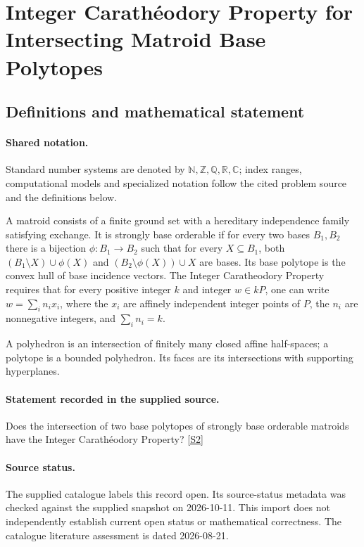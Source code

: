 \documentclass[11pt]{article}
\newcommand{\sref}[2]{\hyperlink{source:#1:#2}{[S#2]}}
\begin{document}
\section{Integer Carathéodory Property for Intersecting Matroid Base Polytopes}\label{statement}

\subsection{Definitions and mathematical statement}

\paragraph{Shared notation.}Standard number systems are denoted by $\mathbb N,\mathbb Z,\mathbb Q,\mathbb R,\mathbb C$; index ranges, computational models and specialized notation follow the cited problem source and the definitions below.


A matroid consists of a finite ground set with a hereditary independence family satisfying exchange. It is strongly base orderable if for every two bases $B_1,B_2$ there is a bijection $\phi:B_1\to B_2$ such that for every $X\subseteq B_1$, both $(B_1\setminus X)\cup\phi(X)$ and $(B_2\setminus\phi(X))\cup X$ are bases. Its base polytope is the convex hull of base incidence vectors. The Integer Caratheodory Property requires that for every positive integer $k$ and integer $w\in kP$, one can write $w=\sum_i n_ix_i$, where the $x_i$ are affinely independent integer points of $P$, the $n_i$ are nonnegative integers, and $\sum_i n_i=k$.

A polyhedron is an intersection of finitely many closed affine half-spaces; a polytope is a bounded polyhedron. Its faces are its intersections with supporting hyperplanes.
\paragraph{Statement recorded in the supplied source.}
Does the intersection of two base polytopes of strongly base orderable matroids have the Integer Carathéodory Property? \sref{statement}{2}
\paragraph{Source status.}
The supplied catalogue labels this record open. Its source-status metadata was checked against the supplied snapshot on 2026-10-11. This import does not independently establish current open status or mathematical correctness. The catalogue literature assessment is dated 2026-08-21.
\end{document}

